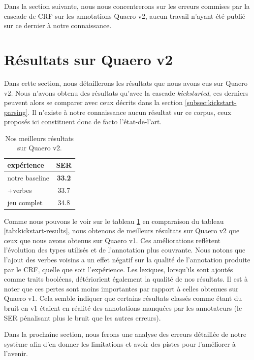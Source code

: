 \documentclass[12pt,a4paper,times,twoside,openright]{report}
\begin{document}
Dans la section suivante, nous nous concentrerons sur les erreurs commises par la cascade de CRF sur les annotations Quaero v2, aucun travail n'ayant été publié sur ce dernier à notre connaissance.


    
    \section{Résultats sur Quaero v2}
    \label{sec:quaero-v2-results}
Dans cette section, nous détaillerons les résultats que nous avons eus sur Quaero v2. Nous n'avons obtenu des résultats qu'avec la cascade \textit{kickstarted}, ces derniers peuvent alors se comparer avec ceux décrits dans la section \ref{subsec:kickstart-parsing}. Il n'existe à notre connaissance aucun résultat sur ce corpus, ceux proposés ici constituent donc de facto l'état-de-l'art.

\begin{table}[ht!]
    \centering
    \begin{tabular}{|l|c|}
    \hline
    expérience     & SER \\
    \hline
    notre baseline & \textbf{33.2} \\
    +verbes        & 33.7 \\
    jeu complet    & 34.8 \\
    \hline
    \end{tabular}
    \caption{Nos meilleurs résultats sur Quaero v2.}
    \label{tab:quaero-v2-results}
\end{table}

Comme nous pouvons le voir sur le tableau \ref{tab:quaero-v2-results} en comparaison du tableau \ref{tab:kickstart-results}, nous obtenons de meilleurs résultats sur Quaero v2 que ceux que nous avons obtenus sur Quaero v1. Ces améliorations reflètent l'évolution des types utilisés et de l'annotation plus couvrante. Nous notons que l'ajout des verbes voisins a un effet négatif sur la qualité de l'annotation produite par le CRF, quelle que soit l'expérience. Les lexiques, lorsqu'ils sont ajoutés comme traits booléens, détériorient également la qualité de nos résultats. Il est à noter que ces pertes sont moins importantes par rapport à celles obtenues sur Quaero v1. Cela semble indiquer que certains résultats classés comme étant du bruit en v1 étaient en réalité des annotations manquées par les annotateurs (le SER pénalisant plus le bruit que les autres erreurs).

Dans la prochaîne section, nous ferons une analyse des erreurs détaillée de notre système afin d'en donner les limitations et avoir des pistes pour l'améliorer à l'avenir.
\end{document}
